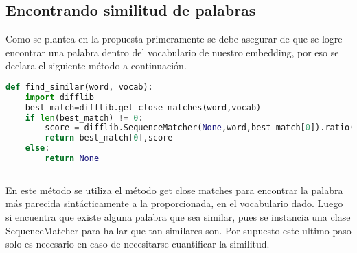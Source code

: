 \subsection{Encontrando similitud de palabras}
Como se plantea en la propuesta primeramente se debe asegurar de que se logre encontrar una palabra dentro del vocabulario de nuestro embedding, por eso se declara el siguiente método a continuación.

\begin{lstlisting}[language=Python, caption={Método para encontrar palabras similares en un vocabulario}]
  def find_similar(word, vocab):
  	import difflib
  	best_match=difflib.get_close_matches(word,vocab)
  	if len(best_match) != 0:
    	score = difflib.SequenceMatcher(None,word,best_match[0]).ratio()
    	return best_match[0],score
    else:
    	return None
    	
\end{lstlisting}
En este método se utiliza el método get$\_{}$close$\_{}$matches para encontrar la palabra más parecida sintácticamente a la proporcionada, en el vocabulario dado.
Luego si encuentra que existe alguna palabra que sea similar, pues se instancia una clase SequenceMatcher para hallar que tan similares son. Por supuesto este ultimo paso solo es necesario en caso de necesitarse cuantificar la similitud.

